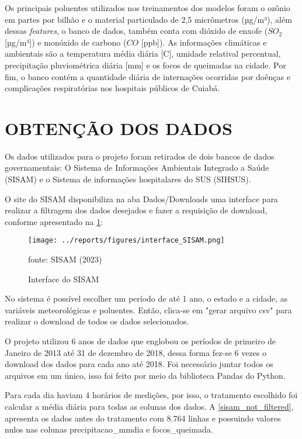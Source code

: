 \documentclass[
  12pt,		%
  a4paper,	%
  openright,%
  oneside,	%
  chapter=TITLE,		%
  section=TITLE,		%
  english,	%
  french,	%
  spanish,	%
  brazil	%
]{abntex2}
\begin{document}
    Os principais poluentes utilizados nos treinamentos dos modelos foram o ozônio em partes por bilhão e
    o material particulado de 2,5 micrômetros (µg/m³), além dessas \textit{features}, o banco de
    dados, também conta com dióxido de enxofe ($SO_2$ [µg/m³]) e monóxido de carbono ($CO$ [ppb]). As informações
    climáticas e ambientais são a temperatura média diária [\textdegree C], umidade relatival percentual, 
     precipitação pluviométrica diária [mm] e os focos de queimadas na cidade. Por fim, o banco contém 
    a quantidade diária de internações ocorridas por doênças e complicações respiratórias nos hospitais públicos
    de Cuiabá. 

    \section{OBTENÇÃO DOS DADOS}
    
    Os dados utilizados para o projeto foram retirados de dois bancos de dados governamentais: O 
    Sistema de Informações Ambientais Integrado a Saúde (SISAM) e o Sistema de informações hospitalares do SUS (SIHSUS).

    O site do SISAM disponibiliza na aba Dados/Downloads uma interface para realizar a filtragem dos dados desejados e 
    fazer a requisição de download, conforme apresentado na \ref*{int_sisam}:

    \begin{figure}[ht]
        \centering
        \caption{Interface do SISAM}
        \texttt{[image: ../reports/figures/interface\_SISAM.png]}
        \label{int_sisam}
        \par
        {\small fonte: SISAM (2023)}
    \end{figure}

    No sistema é possível escolher um período de até 1 ano, o estado e a cidade, as variáveis 
    meteorológicas e poluentes. Então, clica-se em "gerar arquivo csv" para realizar o download de todos os
    dados selecionados.

    O projeto utilizou 6 anos de dados que englobou os períodos de primeiro de Janeiro de 2013 
    até 31 de dezembro de 2018, dessa forma fez-se 6 vezes o download dos dados para cada ano até 2018.
    Foi necessário juntar todos os arquivos em um único, isso foi feito por meio da biblioteca Pandas do Python.

    Para cada dia haviam 4 horários de medições, por isso, o tratamento escolhido foi 
    calcular a média diária para todas as colunas dos dados. 
    A \ref*{sisam_not_filtered}, apresenta os dados antes do tratamento com 8.764 linhas 
    e possuindo valores nulos nas colunas precipitacao\_mmdia e focos\_queimada.
    
\end{document}
